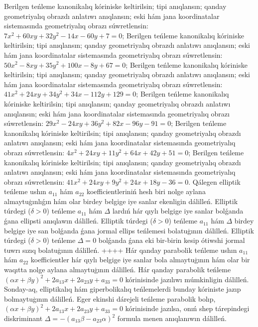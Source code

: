 Berilgen teńleme kanonikalıq kóriniske keltirilsin; tipi anıqlansın; qanday geometriyalıq obrazdı anlatıwı anıqlansın; eski hám jana koordinatalar sistemasında geometriyalıq obrazı súwretlensin: $7 x^2+60 x y+32 y^2-14 x-60 y+7=0$;
Berilgen teńleme kanonikalıq kóriniske keltirilsin; tipi anıqlansın; qanday geometriyalıq obrazdı anlatıwı anıqlansın; eski hám jana koordinatalar sistemasında geometriyalıq obrazı súwretlensin: $50 x^2-8 x y+35 y^2+100 x-8 y+67=0$;
Berilgen teńleme kanonikalıq kóriniske keltirilsin; tipi anıqlansın; qanday geometriyalıq obrazdı anlatıwı anıqlansın; eski hám jana koordinatalar sistemasında geometriyalıq obrazı súwretlensin: $41 x^2+24 x y+34 y^2+34 x-112 y+129=0$;
Berilgen teńleme kanonikalıq kóriniske keltirilsin; tipi anıqlansın; qanday geometriyalıq obrazdı anlatıwı anıqlansın; eski hám jana koordinatalar sistemasında geometriyalıq obrazı súwretlensin: $29 x^2-24 x y+36 y^2+82 x-96 y-91=0$;
Berilgen teńleme kanonikalıq kóriniske keltirilsin; tipi anıqlansın; qanday geometriyalıq obrazdı anlatıwı anıqlansın; eski hám jana koordinatalar sistemasında geometriyalıq obrazı súwretlensin: $4 x^2+24 x y+11 y^2+64 x+42 y+51=0$;
Berilgen teńleme kanonikalıq kóriniske keltirilsin; tipi anıqlansın; qanday geometriyalıq obrazdı anlatıwı anıqlansın; eski hám jana koordinatalar sistemasında geometriyalıq obrazı súwretlensin: $41 x^2+24 x y+9 y^2+24 x+18 y-36=0$.
Qálegen elliptik teńleme ushın $a_{11}$ hám $a_{22}$ koefficientleriniń hesh biri nolge aylana almaytuģınlıǵın hám olar birdey belgige iye sanlar ekenligin dálilleń.
Elliptik túrdegi ($\delta>0$) teńleme $a_{11}$ hám $\Delta$ lardıń hár qıylı belgige iye sanlar bolǵanda ǵana ellipsti anıqlawın dálilleń.
Elliptik túrdegi ($\delta>0$) teńleme $a_{11}$ hám $\Delta$ birdey belgige iye san bolǵanda ǵana jormal ellips teńlemesi bolatuģının dálilleń.
Elliptik túrdegi ($\delta>0$) teńleme $\Delta=0$ bolǵanda ǵana eki bir-birin kesip ótiwshi jormal tuwrı sızıq bolatuģının dálilleń.
++++
Hár qanday parabolik teńleme ushın $a_{11}$ hám $a_{22}$ koefficientler hár qıylı belgige iye sanlar bola almaytuģının hám olar bir waqıtta nolge aylana almaytuģının dálilleń.
Hár qanday parabolik teńleme $ (\alpha x+\beta y) ^2+2a_{13}x+2a_{23}y+a_{33}=0$ kórinisinde jazılıwı múmkinligin dálilleń. Sonday-aq, elliptikalıq hám giperbolikalıq teńlemelerdi bunday kóriniste jazıp bolmaytuģının dálilleń.
Eger ekinshi dárejeli teńleme parabolik bolıp, $ (\alpha x+\beta y) ^2+2a_{13}x+2a_{23}y+a_{33}=0$ kórinisinde jazılsa, onıń shep tárepindegi diskriminant $\Delta=- (a_{13} \beta-a_{23} \alpha) ^2$ formula menen anıqlanıwın dálilleń.
